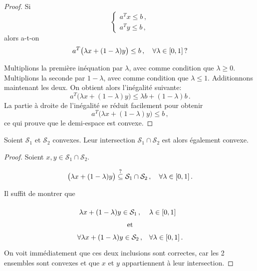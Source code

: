 	\begin{mytheo}\label{theo:demi-espace}\leavevmode
		\begin{proof}
			Si
			\[
			\left\{
			\begin{array}{c}
				a^T x \le b\,,\\
				a^T y \le b\,,
			\end{array}
			\right.
			\]
			alors a-t-on
			\[
			a^T \big(\lambda x + (1 - \lambda)y\big) \le b\,,
			\quad \forall \lambda \in \interval{0}{1}\,?
			\]

			Multiplions la première inéquation par $\lambda$,
			avec comme condition que $\lambda \ge 0$.
			Multiplions la seconde par $1-\lambda$,
			avec comme condition que $\lambda \le 1$.
			Additionnons maintenant les deux.
			On obtient alors l'inégalité suivante:
			\[
			a^T \big(\lambda x + (1 - \lambda)y\big) \le
			\lambda b + (1-\lambda) b\,.
			\]
			La partie à droite de l'inégalité se réduit facilement
			pour obtenir
			\[
			a^T \big(\lambda x + (1 - \lambda)y\big) \le b\,,
			\]
			ce qui prouve que le demi-espace est convexe.
		\end{proof}
	\end{mytheo}

	\begin{mytheo}\label{theo:inter}\leavevmode
		Soient $\mathcal{S}_1$ et $\mathcal{S}_2$ convexes.
		Leur intersection $\mathcal{S}_1 \cap \mathcal{S}_2$
		est alors également convexe.

		\begin{proof}
			Soient $x,y \in \mathcal{S}_1 \cap \mathcal{S}_2$.

			\[
			\big(\lambda x + (1 - \lambda)y\big) \overset{?}{\subseteq} \mathcal{S}_1 \cap \mathcal{S}_2\,,
			\quad \forall \lambda \in \interval{0}{1}\,.
			\]

			Il suffit de montrer que

			\[
			\renewcommand{\arraystretch}{1.5}
			\begin{tabular}{c@{\quad}l}
				$\lambda x + (1 - \lambda)y \in \mathcal{S}_1\,,$ &
				$\lambda \in \interval{0}{1}$\\
				\multicolumn{2}{c}{et}\\
				$\forall \lambda x + (1 - \lambda)y \in \mathcal{S}_2\,,$ &
				$\forall \lambda \in \interval{0}{1}\,.$\\
			\end{tabular}
			\]
			On voit immédiatement
			que ces deux inclusions sont correctes,
			car les 2 ensembles sont convexes
			et que $x$ et $y$ appartiennent à leur intersection.
		\end{proof}
	\end{mytheo}

